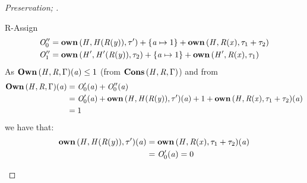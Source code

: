 \begin{proof}[Preservation; ]
\begin{rneqncase}{R-Assign}
    \begin{align*}
      \mathit{O''_{{\mathrm{0}}}} & = \mathbf{own} \, (  \mathit{H}  ,  \mathit{H}  (  \mathit{R}  (  \mathit{y}  )  )  ,  \tau'  )  +  \{  \mathit{a}  \mapsto  1  \}  +  \mathbf{own} \, (  \mathit{H}  ,  \mathit{R}  (  \mathit{x}  )  ,  \tau_{{\mathrm{1}}}  +  \tau_{{\mathrm{2}}}  ) \\
      \mathit{O''_{{\mathrm{1}}}} & = \mathbf{own} \, (  \mathit{H'}  ,  \mathit{H'}  (  \mathit{R}  (  \mathit{y}  )  )  ,  \tau_{{\mathrm{2}}}  )  +  \{  \mathit{a}  \mapsto  1  \}  +  \mathbf{own} \, (  \mathit{H'}  ,  \mathit{R}  (  \mathit{x}  )  ,  \tau_{{\mathrm{1}}}  )
    \end{align*}
    As $\mathbf{Own} \, (  \mathit{H}  ,  \mathit{R}  ,  \Gamma  )  (  \mathit{a}  )  \le  1$ (from $\mathbf{Cons} \, (  \mathit{H}  ,  \mathit{R}  ,  \Gamma  )$) and from
    \begin{align*}
      \mathbf{Own} \, (  \mathit{H}  ,  \mathit{R}  ,  \Gamma  )  (  \mathit{a}  ) & = \mathit{O'_{{\mathrm{0}}}}  (  \mathit{a}  )  +  \mathit{O''_{{\mathrm{0}}}}  (  \mathit{a}  ) \\
                           & = \mathit{O'_{{\mathrm{0}}}}  (  \mathit{a}  )  +  \mathbf{own} \, (  \mathit{H}  ,  \mathit{H}  (  \mathit{R}  (  \mathit{y}  )  )  ,  \tau'  )  (  \mathit{a}  )  +  1  +  \mathbf{own} \, (  \mathit{H}  ,  \mathit{R}  (  \mathit{x}  )  ,  \tau_{{\mathrm{1}}}  +  \tau_{{\mathrm{2}}}  )  (  \mathit{a}  ) \\
                           & = 1
    \end{align*}
    we have that:
    \begin{align*}
      \mathbf{own} \, (  \mathit{H}  ,  \mathit{H}  (  \mathit{R}  (  \mathit{y}  )  )  ,  \tau'  )  (  \mathit{a}  ) & = \mathbf{own} \, (  \mathit{H}  ,  \mathit{R}  (  \mathit{x}  )  ,  \tau_{{\mathrm{1}}}  +  \tau_{{\mathrm{2}}}  )  (  \mathit{a}  ) \\
                               & = \mathit{O'_{{\mathrm{0}}}}  (  \mathit{a}  )  =  0
    \end{align*}


\end{rneqncase}
\end{proof}
